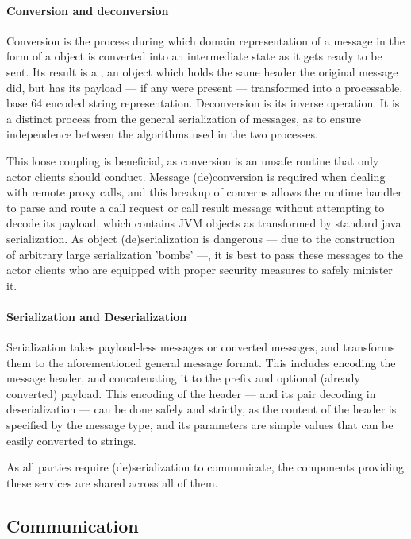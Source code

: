 			\paragraph{Conversion and deconversion}
		
			Conversion is the process during which domain representation of a message in the form of a  object is converted into an intermediate state as it gets ready to be sent. Its result is a , an object which holds the same header the original message did, but has its payload --- if any were present --- transformed into a processable, base 64 encoded string representation. Deconversion is its inverse operation. It is a distinct process from the general serialization of messages, as to ensure independence between the algorithms used in the two processes.
			
			This loose coupling is beneficial, as conversion is an unsafe routine that only actor clients should conduct. Message (de)conversion is required when dealing with remote proxy calls, and this breakup of concerns allows the runtime handler to parse and route a call request or call result message without attempting to decode its payload, which contains JVM objects as transformed by standard java serialization. As object (de)serialization is dangerous --- due to the construction of arbitrary large serialization 'bombs' ---, it is best to pass these messages to the actor clients who are equipped with proper security measures to safely minister it.

			\paragraph{Serialization and Deserialization}
			
			Serialization takes payload-less messages or converted messages, and transforms them to the aforementioned general message format. This includes encoding the message header, and concatenating it to the prefix and optional (already converted) payload. This encoding of the header --- and its pair decoding in deserialization --- can be done safely and strictly, as the content of the header is specified by the message type, and its parameters are simple values that can be easily converted to strings.
			
			As all parties require (de)serialization to communicate, the components providing these services are shared across all of them.

		\subsection{Communication}
		
